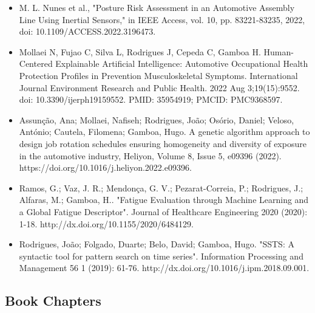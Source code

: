 \begin{itemize}

\item M. L. Nunes et al., "Posture Risk Assessment in an Automotive Assembly Line Using Inertial Sensors," in IEEE Access, vol. 10, pp. 83221-83235, 2022, doi: 10.1109/ACCESS.2022.3196473.

\item Mollaei N, Fujao C, Silva L, Rodrigues J, Cepeda C, Gamboa H. Human-Centered Explainable Artificial Intelligence: Automotive Occupational Health Protection Profiles in Prevention Musculoskeletal Symptoms. International Journal Environment Research and Public Health. 2022 Aug 3;19(15):9552. doi: 10.3390/ijerph19159552. PMID: 35954919; PMCID: PMC9368597.

\item Assunção, Ana; Mollaei, Nafiseh; Rodrigues, João; Osório, Daniel; Veloso, António; Cautela, Filomena; Gamboa, Hugo. A genetic algorithm approach to design job rotation schedules ensuring homogeneity and diversity of exposure in the automotive industry, Heliyon, Volume 8, Issue 5, e09396 (2022). https://doi.org/10.1016/j.heliyon.2022.e09396.

\item Ramos, G.; Vaz, J. R.; Mendonça, G. V.; Pezarat-Correia, P.; Rodrigues, J.; Alfaras, M.; Gamboa, H.. "Fatigue Evaluation through Machine Learning and a Global Fatigue Descriptor". Journal of Healthcare Engineering 2020 (2020): 1-18. http://dx.doi.org/10.1155/2020/6484129.

\item Rodrigues, João; Folgado, Duarte; Belo, David; Gamboa, Hugo. "SSTS: A syntactic tool for pattern search on time series". Information Processing and Management 56 1 (2019): 61-76. http://dx.doi.org/10.1016/j.ipm.2018.09.001.
\end{itemize}

\subsection{Book Chapters}

